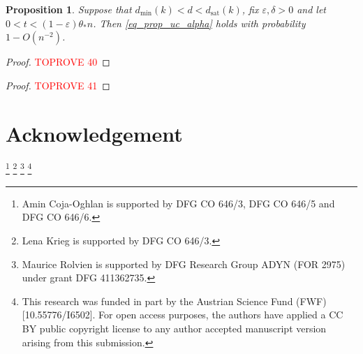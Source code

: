 \documentclass[10pt,reqno]{amsart}
\numberwithin{equation}{section}
\newcommand\dmin{d_{\mathrm{min}}}
\newcommand\dsat{d_{\mathrm{sat}}}
\newcommand\eps{\varepsilon}
\newtheorem{proposition}[definition]{Proposition}
\begin{document}
\begin{proposition}\label{prop_bpgd_cond}
	Suppose that $\dmin(k)<d<\dsat(k)$, fix $\eps,\delta>0$ and let $0<t<(1-\eps)\theta_*n$.
	Then \eqref{eq_prop_uc_alpha} holds with probability $1-O(n^{-2})$.
\end{proposition}
\begin{proof}\textcolor{red}{TOPROVE 40}\end{proof}

\begin{proof}\textcolor{red}{TOPROVE 41}\end{proof}

\section*{Acknowledgement}

\thanks{Amin Coja-Oghlan is supported by DFG CO 646/3, DFG CO 646/5 and DFG CO 646/6.}
\thanks{Lena Krieg is supported by DFG CO 646/3.}
\thanks{Maurice Rolvien is supported by DFG Research Group ADYN (FOR 2975) under grant DFG 411362735.}
\thanks{This research was funded in part by the Austrian Science Fund (FWF) [10.55776/I6502]. For open access purposes, the authors have applied a CC BY public copyright license to any author accepted manuscript version arising from this submission.}



\end{document}
